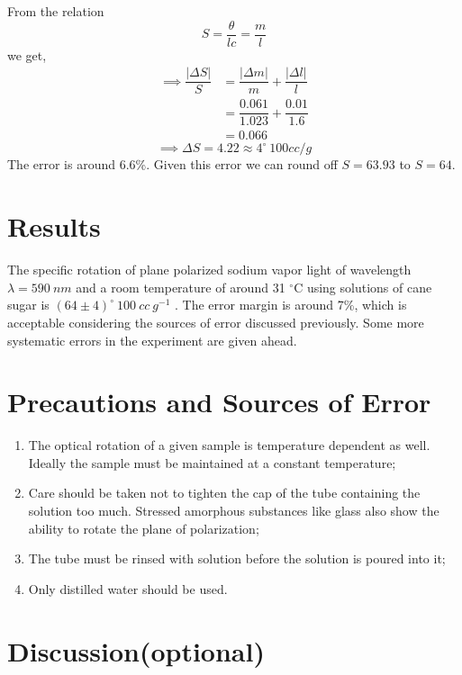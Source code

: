\documentclass{dkpinto-report}
\begin{document}
From the relation 
$$S = \dfrac{\theta}{lc} = \dfrac{m}{l}$$
we get, 
\begin{align*}
\implies \dfrac{|\Delta S|}{S}  &= \dfrac{|\Delta m|}{m} + \dfrac{|\Delta l| }{l} \\
&= \dfrac{0.061}{1.023} + \dfrac{0.01}{1.6}\\
&= 0.066
\end{align*}
$$\implies \Delta S =  4.22 \approx 4^{\circ}\ 100 cc / g$$
The error is around 6.6\%. Given this error we can round off $S = 63.93$ to $S = 64$.

\section{Results}
The specific rotation of plane polarized sodium vapor light of wavelength $\lambda = 590\ nm$ and a room temperature of  around 31 $^{\circ}$C using solutions of cane sugar is $(64  \pm 4 ) ^{\circ}\ 100\ cc\ g^{-1}$ . The error margin is around 7\%, which is acceptable considering the sources of error discussed previously. Some more systematic errors in the experiment are given ahead.

 
\section{Precautions and Sources of Error}
\begin{enumerate}
\itemsep0em
\item The optical rotation of a given sample is temperature dependent as well. Ideally the sample must be maintained at a constant temperature;
\item Care should be taken not to tighten the cap of the tube containing the solution too much.  Stressed amorphous substances like glass also show the ability to rotate the plane of polarization;
\item The tube must be rinsed with solution before the solution is poured into it;
\item Only distilled water should be used.
\end{enumerate}

\section{Discussion(optional)}


\end{document}
